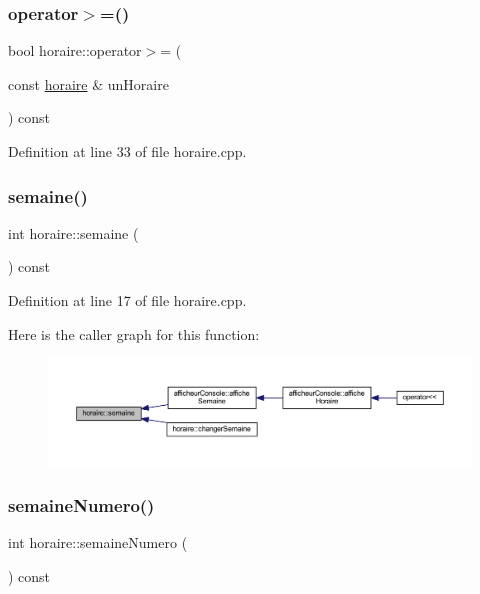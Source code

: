 \subsubsection{\texorpdfstring{operator$>$=()}{operator>=()}}
{\footnotesize\ttfamily bool horaire\+::operator$>$= (\begin{DoxyParamCaption}\item[{const \hyperlink{classhoraire}{horaire} \&}]{un\+Horaire }\end{DoxyParamCaption}) const}



Definition at line 33 of file horaire.\+cpp.

\hypertarget{classhoraire_ae53308a6dd6c802a5f2b21ffc93c0ed4}{}\label{classhoraire_ae53308a6dd6c802a5f2b21ffc93c0ed4} 
\subsubsection{\texorpdfstring{semaine()}{semaine()}}
{\footnotesize\ttfamily int horaire\+::semaine (\begin{DoxyParamCaption}{ }\end{DoxyParamCaption}) const}



Definition at line 17 of file horaire.\+cpp.

Here is the caller graph for this function\+:\nopagebreak
\begin{figure}[H]
\begin{center}
\leavevmode
\includegraphics[width=350pt]{classhoraire_ae53308a6dd6c802a5f2b21ffc93c0ed4_icgraph}
\end{center}
\end{figure}
\hypertarget{classhoraire_a856d1830c70ff94ebdbaa6c6dcbe6347}{}\label{classhoraire_a856d1830c70ff94ebdbaa6c6dcbe6347} 
\subsubsection{\texorpdfstring{semaine\+Numero()}{semaineNumero()}}
{\footnotesize\ttfamily int horaire\+::semaine\+Numero (\begin{DoxyParamCaption}{ }\end{DoxyParamCaption}) const}



